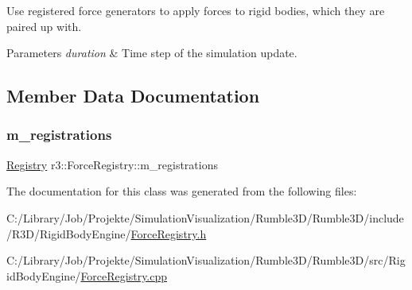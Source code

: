 Use registered force generators to apply forces to rigid bodies, which they are paired up with. 


\begin{DoxyParams}{Parameters}
{\em duration} & Time step of the simulation update. \\
\hline
\end{DoxyParams}


\subsection{Member Data Documentation}
\mbox{\label{classr3_1_1_force_registry_a36847da26301dc4b18e6b6b25fb2fa51}} 
\subsubsection{\texorpdfstring{m\+\_\+registrations}{m\_registrations}}
{\footnotesize\ttfamily \mbox{\hyperlink{classr3_1_1_force_registry_a91449a71b1a33d773ef787ae56ae9b2d}{Registry}} r3\+::\+Force\+Registry\+::m\+\_\+registrations\hspace{0.3cm}{\ttfamily [protected]}}



The documentation for this class was generated from the following files\+:\begin{DoxyCompactItemize}
\item 
C\+:/\+Library/\+Job/\+Projekte/\+Simulation\+Visualization/\+Rumble3\+D/\+Rumble3\+D/include/\+R3\+D/\+Rigid\+Body\+Engine/\mbox{\hyperlink{_force_registry_8h}{Force\+Registry.\+h}}\item 
C\+:/\+Library/\+Job/\+Projekte/\+Simulation\+Visualization/\+Rumble3\+D/\+Rumble3\+D/src/\+Rigid\+Body\+Engine/\mbox{\hyperlink{_force_registry_8cpp}{Force\+Registry.\+cpp}}\end{DoxyCompactItemize}
